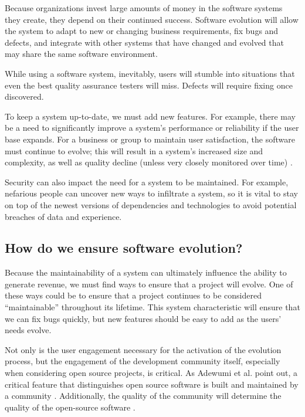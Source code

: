 Because organizations invest large amounts of money in the software systems they create, they depend on their continued success. Software evolution will allow the system to adapt to new or changing business requirements, fix bugs and defects, and integrate with other systems that have changed and evolved that may share the same software environment.

While using a software system, inevitably, users will stumble into situations that even the best quality assurance testers will miss. Defects will require fixing once discovered. 

To keep a system up-to-date, we must add new features. For example, there may be a need to significantly improve a system's performance or reliability if the user base expands. For a business or group to maintain user satisfaction, the software must continue to evolve; this will result in a system's increased size and complexity, as well as quality decline (unless very closely monitored over time) \cite{yu:2013}.

Security can also impact the need for a system to be maintained. For example, nefarious people can uncover new ways to infiltrate a system, so it is vital to stay on top of the newest versions of dependencies and technologies to avoid potential breaches of data and experience.

\subsection{How do we ensure software evolution?} \label{subEnsureEvolution}

Because the maintainability of a system can ultimately influence the ability to generate revenue, we must find ways to ensure that a project will evolve. One of these ways could be to ensure that a project continues to be considered ``maintainable'' throughout its lifetime. This system characteristic will ensure that we can fix bugs quickly, but new features should be easy to add as the users' needs evolve.

Not only is the user engagement necessary for the activation of the evolution process, but the engagement of the development community itself, especially when considering open source projects, is critical. As Adewumi et al. point out, a critical feature that distinguishes open source software is built and maintained by a community \cite{haaland:2010}. Additionally, the quality of the community will determine the quality of the open-source software \cite{samoladas:2008}.
